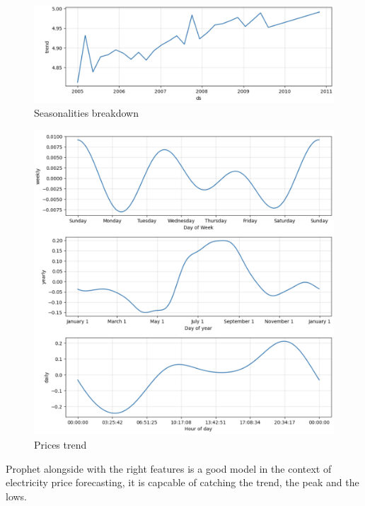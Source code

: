 \begin{figure}[!h]
    \includegraphics[width=\textwidth]{images/prophet_price2.1.png}
    \caption{Seasonalities breakdown}
    \label{fig:prophet_price2.1}
\end{figure}

\begin{figure}[!h]
    \includegraphics[width=\textwidth]{images/prophet_price2.2.png}
    \caption{Prices trend}
    \label{fig:prophet_price2.2}
\end{figure}
Prophet alongside with the right features is a good model in the context of electricity price forecasting, it is capcable of catching the trend, the peak and the lows. 

